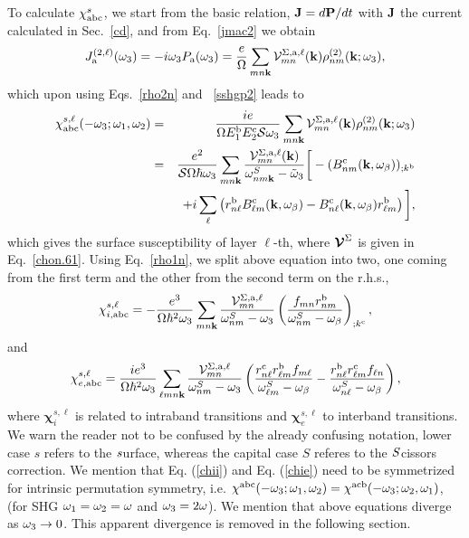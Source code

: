 \documentclass[floatfix,prb,aps,superscriptaddress,11pt,preprint]{revtex4}
\begin{document}
To calculate $\chi_{\mathrm{a}\mathrm{b}\mathrm{c}}^s$,
we start from the basic relation, $\mathbf{J}=d\mathbf{P}/dt$ 
with $\mathbf{J}$ the current calculated in Sec.~\ref{cd}, and
from Eq.~\eqref{jmac2} we obtain
\begin{equation}\label{Pjikn}
J_{\mathrm{a}}^{(2,\ell)}(\omega_3)=-i\omega_3P_{\mathrm{a}}(\omega_3)
=\frac{e}{\Omega}
\sum_{mn\mathbf{k}}
{\mathbf{\cal V}}^{\Sigma,\mathrm{a},\ell}_{mn}(\mathbf{k})
\rho^{(2)}_{nm}(\mathbf{k};\omega_3)
,
\end{equation}
which upon using Eqs.~\eqref{rho2n} and ~\eqref{sshgp2} leads to
\begin{eqnarray}\label{Pjikn2}
\chi^{s,\ell}_{\mathrm{a}\mathrm{b}\mathrm{c}}(-\omega_3;\omega_1,\omega_2)
&=&
\frac{ie}{\Omega E^{\mathrm{b}}_1E^{\mathrm{c}}_2{\cal S} \omega_3}
\sum_{mn\mathbf{k}}
{\mathbf{\cal V}}^{\Sigma,\mathrm{a},\ell}_{mn}(\mathbf{k})
\rho^{(2)}_{nm}(\mathbf{k};\omega_3)
\nonumber \\
&=&
\frac{e^2}{{\cal S}\Omega\hbar\omega_3}
\sum_{mn\mathbf{k}}
\frac{{\mathbf{\cal V}}^{\Sigma,\mathrm{a},\ell}_{mn}(\mathbf{k})}
{\omega^S_{nm\mathbf{k}}-\tilde\omega_3}
\bigg[
-(B_{nm}^{\mathrm{c}}(\mathbf{k},\omega_\beta))_{;k^{\mathrm{b}}}
\nonumber \\
&&
+i\sum_\ell\left(r_{n\ell}^{\mathrm{b}}B_{\ell m}^{\mathrm{c}}(\mathbf{k},\omega_\beta) -
  B_{n\ell}^{\mathrm{c}}(\mathbf{k},\omega_\beta) 
  r_{\ell m}^{\mathrm{b}}\right)
\bigg]
,
\end{eqnarray}
which gives the surface susceptibility of layer $\ell$-th, where 
$\boldsymbol{\mathcal{\cal V}}^\Sigma$ is given in Eq.~\eqref{chon.61}.
Using Eq.~\eqref{rho1n}, we
split above equation into
two, one coming from the first term and the other
from the second term on the r.h.s.,
\begin{equation}\label{chii}
\chi_{i,\mathrm{a}\mathrm{b}\mathrm{c}}^{s,\ell}=-\frac{e^3}{\Omega\hbar^2\omega_3}\sum_{mn\mathbf{k}}
\frac{{\mathbf{\cal V}}_{mn}^{\Sigma,\mathrm{a},\ell}}{\omega^S_{nm}-\omega_3}
\left(\frac{f_{mn}r_{nm}^{\mathrm{b}}}{\omega^S_{nm}-\omega_\beta}\right)_{;k^{\mathrm{c}}},
\end{equation} 
and
\begin{equation}\label{chie}
\chi_{e,\mathrm{a}\mathrm{b}\mathrm{c}}^{s,\ell}=\frac{ie^3}{\Omega\hbar^2\omega_3}\sum_{\ell mn\mathbf{k}}
\frac{{\mathbf{\cal V}}_{mn}^{\Sigma,\mathrm{a},\ell}}{\omega^S_{nm}-\omega_3}
\left(
\frac{r_{n\ell}^{\mathrm{c}} r_{\ell m}^{\mathrm{b}} 
f_{m\ell}}{\omega^S_{\ell m}-\omega_\beta}
-\frac{r_{n\ell}^{\mathrm{b}} r_{\ell m}^{\mathrm{c}} 
f_{\ell n}}{\omega^S_{n \ell}-\omega_\beta}
\right),
\end{equation} 
where $\boldsymbol{\chi}^{s,\ell}_i$
 is related to intraband transitions and
$\boldsymbol{\chi}^{s,\ell}_e$
to interband transitions. We warn the reader not to be confused by the
already confusing notation, lower case $s$ refers to the $\it
s$urface, whereas the capital case $S$ referes to the $\it S$cissors correction.   
We mention that
Eq. (\ref{chii}) and Eq. (\ref{chie}) need to be symmetrized for intrinsic
permutation symmetry, i.e.
$\chi^{\mathrm{a}\mathrm{b}\mathrm{c}}(-\omega_3;\omega_1,\omega_2)=\chi^{\mathrm{a}\mathrm{c}\mathrm{b}}(-\omega_3;\omega_2,\omega_1)$,\cite{rashkeev98}
(for SHG $\omega_1=\omega_2=\omega$ and $\omega_3=2\omega$). We mention that above
equations diverge as $\omega_3\to 0$. This apparent divergence is removed
in the following section.
\end{document}
